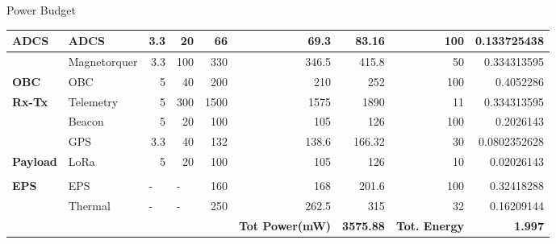 \documentclass[aspectratio=169]{beamer}
\begin{document}
\begin{frame}{Power Budget}
\begin{table}[]
\begin{adjustbox}{width=\columnwidth,center}
\begin{tabular}{|l|l|r|r|r|r|r|r|r|}
					\rowcolor[HTML]{FFE6DD} 
					\textbf{ADCS} &
					ADCS &
					3.3 &
					20 &
					66 &
					69.3 &
					83.16 &
					100 &
					0.133725438 \\ \hline
					\rowcolor[HTML]{FFE6DD} 
					&
					Magnetorquer &
					3.3 &
					100 &
					330 &
					346.5 &
					415.8 &
					50 &
					0.334313595 \\ \hline
					\rowcolor[HTML]{FFE6DD} 
					\textbf{OBC} &
					OBC &
					5 &
					40 &
					200 &
					210 &
					252 &
					100 &
					0.4052286 \\ \hline
					\rowcolor[HTML]{FFE6DD} 
					\textbf{Rx-Tx} &
					Telemetry &
					5 &
					300 &
					1500 &
					1575 &
					1890 &
					11 &
					0.334313595 \\ \hline
					\rowcolor[HTML]{FFE6DD} 
					&
					Beacon &
					5 &
					20 &
					100 &
					105 &
					126 &
					100 &
					0.2026143 \\ \hline
					\rowcolor[HTML]{FFE6DD} 
					&
					GPS &
					3.3 &
					40 &
					132 &
					138.6 &
					166.32 &
					30 &
					0.0802352628 \\ \hline
					\rowcolor[HTML]{FFE6DD} 
					\textbf{Payload} &
					LoRa &
					5 &
					20 &
					100 &
					105 &
					126 &
					10 &
					0.02026143 \\ \hline
					\rowcolor[HTML]{FFE6DD} 
					&
					&
					\multicolumn{1}{l|}{\cellcolor[HTML]{FFE6DD}} &
					\multicolumn{1}{l|}{\cellcolor[HTML]{FFE6DD}} &
					\multicolumn{1}{l|}{\cellcolor[HTML]{FFE6DD}} &
					\multicolumn{1}{l|}{\cellcolor[HTML]{FFE6DD}} &
					\multicolumn{1}{l|}{\cellcolor[HTML]{FFE6DD}} &
					\multicolumn{1}{l|}{\cellcolor[HTML]{FFE6DD}} &
					\multicolumn{1}{l|}{\cellcolor[HTML]{FFE6DD}} \\ \hline
					\rowcolor[HTML]{FFE6DD} 
					\textbf{EPS} &
					EPS &
					\multicolumn{1}{l|}{\cellcolor[HTML]{FFE6DD}-} &
					\multicolumn{1}{l|}{\cellcolor[HTML]{FFE6DD}-} &
					160 &
					168 &
					201.6 &
					100 &
					0.32418288 \\ \hline
					\rowcolor[HTML]{FFE6DD} 
					&
					Thermal &
					\multicolumn{1}{l|}{\cellcolor[HTML]{FFE6DD}-} &
					\multicolumn{1}{l|}{\cellcolor[HTML]{FFE6DD}-} &
					250 &
					262.5 &
					315 &
					32 &
					0.16209144 \\ \hline
					\rowcolor[HTML]{FFE6DD} 
					&
					&
					\multicolumn{1}{l|}{\cellcolor[HTML]{FFE6DD}} &
					\multicolumn{1}{l|}{\cellcolor[HTML]{FFE6DD}} &
					\multicolumn{1}{l|}{\cellcolor[HTML]{FFE6DD}} &
					\multicolumn{1}{l|}{\cellcolor[HTML]{FFE6DD}\textbf{Tot Power(mW)}} &
					\textbf{3575.88} &
					\multicolumn{1}{l|}{\cellcolor[HTML]{FFE6DD}\textbf{Tot. Energy}} &
					\textbf{1.997} \\ \hline
				\end{tabular}
			\end{adjustbox}
		\end{table}
		
		
	\end{frame}
\end{document}
